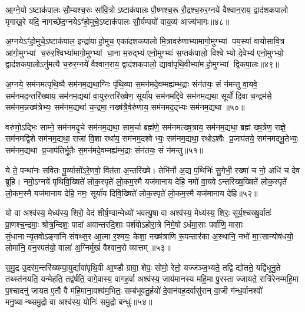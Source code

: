 आ॒ग्ने॒योऽष्टाक॑पालः सौ॒म्यश्च॒रुः सा॑वि॒त्रोऽष्टाक॑पालः पौ॒ष्णश्च॒रू रौ॒द्रश्च॒रुर॒ग्नये॑ वैश्वान॒राय॒ द्वाद॑शकपालो मृगाख॒रे यदि॒ नागच्छे॑द॒ग्नयेऽꣳ॑हो॒मुचे॒ऽष्टाक॑पालः सौ॒र्यम्पयो॑ वाय॒व्य॑ आज्य॑भागः॥४८॥

{\anuvakamend[{आ॒ग्ने॒यश्चतु॑र्विशतिः॥21॥}]}

अ॒ग्नयेऽꣳ॑हो॒मुचे॒ऽष्टाक॑पाल॒ इन्द्रा॑याहो॒मुच॒ एका॑दशकपालो मि॒त्रावरु॑णाभ्यामागो॒मुग्भ्यां पय॒स्या॑ वायोसावि॒त्र आ॑गो॒मुग्भ्यां च॒रुर॒श्विभ्या॑मागो॒मुग्भ्यां धा॒ना म॒रुद्भ्य॑ एनो॒मुग्भ्यः॑ स॒प्तक॑पालो॒ विश्वेभ्यो दे॒वेभ्य॑ एनो॒मुग्भ्यो॒ द्वाद॑शकपा॒लोऽनु॑मत्यै च॒रुर॒ग्नये॑ वैश्वान॒राय॒ द्वाद॑शकपालो॒ द्यावा॑पृथि॒वीभ्या॑महो॒मुग्भ्यां द्विकपा॒लः॥४९॥

{\anuvakamend[{अ॒ग्नयेऽꣳ॑हो॒मुचे त्रि॒ꣳ॒शत्॥22॥}]}

अ॒ग्नये॒ सम॑नमत्पृथि॒व्यै सम॑नम॒द्यथा॒ग्निः पृ॑थि॒व्या स॒मन॑मदे॒वम्मह्य॑म्भ॒द्राः संन॑तयः॒ सं न॑मन्तु वा॒यवे॒ सम॑नमद॒न्तरि॑ख्षाय॒ सम॑नम॒द्यथा॑ वा॒युर॒न्तरि॑ख्षेण॒ सूर्या॑य॒ सम॑नमद्दि॒वे सम॑नम॒द्यथा॒ सूर्यो॑ दि॒वा च॒न्द्रम॑से॒ सम॑नम॒न्नख्ष॑त्रेभ्यः॒ सम॑नम॒द्यथा॑ च॒न्द्रमा॒ नख्ष॑त्रै॒र्वरु॑णाय॒ सम॑नमद॒द्भ्यः सम॑नम॒द्यथा॥५०॥

वरु॑णो॒ऽद्भिः साम्ने॒ सम॑नमदृ॒चे सम॑नम॒द्यथा॒ साम॒र्चा ब्रह्म॑णे॒ सम॑नमत्ख्ष॒त्राय॒ सम॑नम॒द्यथा॒ ब्रह्म॑ ख्ष॒त्रेण॒ राज्ञे॒ सम॑नमद्वि॒शे सम॑नम॒द्यथा॒ राजा॑ वि॒शा रथा॑य॒ सम॑नम॒दश्वेभ्यः॒ सम॑नम॒द्यथा॒ रथोऽश्वैः प्र॒जाप॑तये॒ सम॑नमद्भू॒तेभ्यः॒ सम॑नम॒द्यथा प्र॒जाप॑तिर्भू॒तैः स॒मन॑मदे॒वम्मह्य॑म्भ॒द्राः संन॑तयः॒ सं न॑मन्तु॥५१॥

{\anuvakamend[{अ॒द्भ्यः सम॑नम॒द्यथा॒ मह्य॑ञ्च॒त्वारि॑ च॥23॥}]}

ये ते॒ पन्था॑नः सवितः पू॒र्व्यासो॑ऽरे॒णवो॒ वित॑ता अ॒न्तरि॑ख्षे। तेभि॑र्नो अ॒द्य प॒थिभिः॑ सु॒गेभी॒ रख्षा॑ च नो॒ अधि॑ च देव ब्रूहि। नमो॒ऽग्नये॑ पृथिवि॒ख्षिते॑ लोक॒स्पृते॑ लो॒कम॒स्मै यज॑मानाय देहि॒ नमो॑ वा॒यवेऽन्तरिख्ष॒ख्षिते॑ लोक॒स्पृते॑ लो॒कम॒स्मै यज॑मानाय देहि॒ नमः॒ सूर्या॑य दिवि॒ख्षिते॑ लोक॒स्पृते॑ लो॒कम॒स्मै यज॑मानाय देहि॥५२॥

{\anuvakamend[{ये ते॒ चतु॑श्चत्वारिशत्॥24॥}]}

यो वा अश्व॑स्य॒ मेध्य॑स्य॒ शिरो॒ वेद॑ शीर्\mbox{}ष॒ण्वान्मेध्यो॑ भवत्यु॒षा वा अश्व॑स्य॒ मेध्य॑स्य॒ शिरः॒ सूर्य॒श्चख्षु॒र्वातः॑ प्रा॒णश्च॒न्द्रमाः॒ श्रोत्र॒न्दिशः॒ पादा॑ अवान्तरदि॒शाः पर्\mbox{}श॑वोऽहोरा॒त्रे नि॑मे॒षोऽर्धमा॒साः पर्वा॑णि॒ मासाः सं॒धानान्यृ॒तवोऽङ्गा॑नि संवथ्स॒र आ॒त्मा र॒श्मयः॒ केशा॒ नख्ष॑त्राणि रू॒पन्तार॑का अ॒स्थानि॒ नभो॑ मा॒ꣳ॒सान्योष॑धयो॒ लोमा॑नि॒ वन॒स्पत॑यो॒ वाला॑ अ॒ग्निर्मुखं॑ वैश्वान॒रो व्यात्तम्॥५३॥

स॒मु॒द्र उ॒दर॑म॒न्तरि॑ख्षम्पा॒युर्द्यावा॑पृथि॒वी आ॒ण्डौ ग्रावा॒ शेपः॒ सोमो॒ रेतो॒ यज्ज॑ञ्ज॒भ्यते॒ तद्वि द्यो॑तते॒ यद्वि॑धूनु॒ते तथ्स्त॑नयति॒ यन्मेह॑ति॒ तद्व॑र्\mbox{}षति॒ वागे॒वास्य॒ वागह॒र्वा अश्व॑स्य॒ जाय॑मानस्य महि॒मा पु॒रस्ताज्जायते॒ रात्रि॑रेनम्महि॒मा प॒श्चादनु॑ जायत ए॒तौ वै म॑हि॒माना॒वश्व॑म॒भितः॒ सम्ब॑भूवतु॒र्\mbox{}हयो॑ दे॒वान॑वह॒दर्वासु॑रान् वा॒जी ग॑न्ध॒र्वानश्वो॑ मनु॒ष्यान्थ्समु॒द्रो वा अश्व॑स्य॒ योनिः॑ समु॒द्रो बन्धुः॑॥५४॥

{\anuvakamend[{व्यात्त॑मवह॒द्द्वाद॑श च॥25॥}]}
